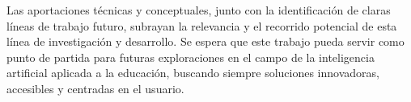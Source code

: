 Las aportaciones técnicas y conceptuales, junto con la identificación de claras líneas de trabajo futuro, subrayan la relevancia y el recorrido potencial de esta línea de investigación y desarrollo. Se espera que este trabajo pueda servir como punto de partida para futuras exploraciones en el campo de la inteligencia artificial aplicada a la educación, buscando siempre soluciones innovadoras, accesibles y centradas en el usuario.
